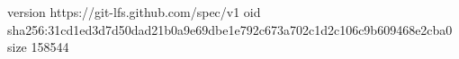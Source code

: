 version https://git-lfs.github.com/spec/v1
oid sha256:31cd1ed3d7d50dad21b0a9e69dbe1e792c673a702c1d2c106c9b609468e2cba0
size 158544
